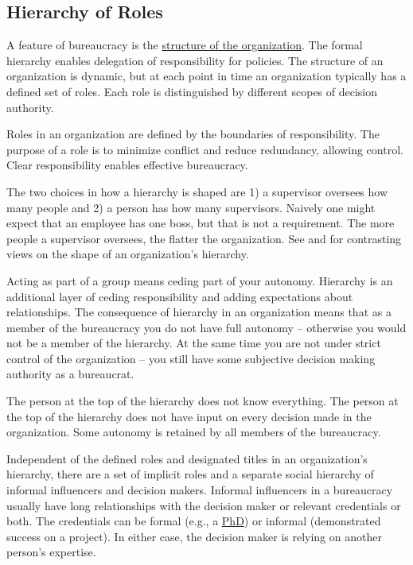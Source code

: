 \subsection{Hierarchy of Roles\label{sec:hierarchy_of_roles}}

A feature of bureaucracy is the \href{https://en.wikipedia.org/wiki/Organizational_structure}{structure of the organization}. The formal hierarchy enables delegation of responsibility for policies. The structure of an organization is dynamic, but at each point in time an organization typically has a defined set of roles. Each role is distinguished by different scopes of decision authority. 

Roles in an organization are defined by the boundaries of responsibility. The purpose of a role is to minimize conflict and reduce redundancy, allowing control. Clear responsibility enables effective bureaucracy. 


The two choices in how a hierarchy is shaped are 1) a supervisor oversees how many people and 2) a person has how many supervisors. Naively one might expect that an employee has one boss, but that is not a requirement. 
The more people a supervisor oversees, the flatter the organization. See \cite{2012_Valve} and \cite{1972_Joreen} for contrasting views on the shape of an organization's hierarchy.

Acting as part of a group means ceding part of your autonomy. Hierarchy is an additional layer of ceding responsibility and adding expectations about relationships.
The consequence of hierarchy in an organization means that as a member of the bureaucracy you do not have full autonomy -- otherwise you would not be a member of the hierarchy. At the same time you are not under strict control of the organization -- you still have some subjective decision making authority as a bureaucrat.

The person at the top of the hierarchy does not know everything. The person at the top of the hierarchy does not have input on every decision made in the organization. Some autonomy is retained by all members of the bureaucracy.

Independent of the defined roles and designated titles in an organization's hierarchy, there are a set of implicit roles and a separate social hierarchy of informal influencers and decision makers. Informal influencers in a bureaucracy usually have long relationships with the decision maker or relevant credentials or both. The credentials can be formal (e.g., a \href{https://en.wikipedia.org/wiki/Doctor_of_Philosophy}{PhD}) or informal (demonstrated success on a project). In either case, the decision maker is relying on another person's expertise. 

